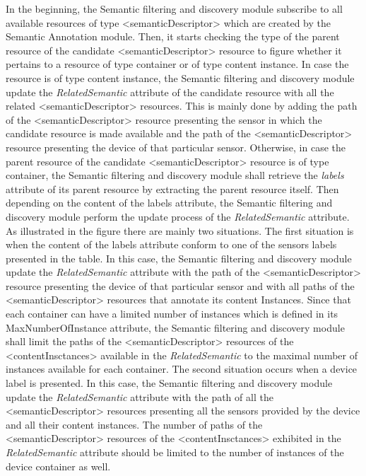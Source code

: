 In the beginning, the Semantic filtering and discovery module subscribe to all available resources of type <semanticDescriptor> which are created by the Semantic Annotation module. Then, it starts checking the type of the parent resource of the candidate <semanticDescriptor> resource to figure whether it pertains to a resource of type container or of type content instance. In case the resource is of type content instance, the Semantic filtering and discovery module update the \textit{RelatedSemantic} attribute of the candidate resource with all the related <semanticDescriptor> resources. This is mainly done by adding the path of the <semanticDescriptor> resource presenting the sensor in which the candidate resource is made available and the path of the <semanticDescriptor> resource presenting the device of that particular sensor. Otherwise, in case the parent resource of the candidate <semanticDescriptor> resource is of type container, the Semantic filtering and discovery module shall retrieve the \textit{labels} attribute of its parent resource by extracting the parent resource itself. Then depending on the content of the labels attribute, the Semantic filtering and discovery module perform the update process of the \textit{RelatedSemantic} attribute. As illustrated in the figure there are mainly two situations. The first situation is when the content of the labels attribute conform to one of the sensors labels presented in the table. In this case, the Semantic filtering and discovery module update the \textit{RelatedSemantic} attribute with the path of the <semanticDescriptor> resource presenting the device of that particular sensor and with all paths of the <semanticDescriptor> resources that annotate its content Instances. Since that each container can have a limited number of instances which is defined in its MaxNumberOfInstance attribute, the Semantic filtering and discovery module shall limit the paths of the <semanticDescriptor> resources of the <contentInsctances> available in the \textit{RelatedSemantic} to the maximal number of instances available for each container. The second situation occurs when a device label is presented. In this case, the Semantic filtering and discovery module update the \textit{RelatedSemantic} attribute with the path of all the <semanticDescriptor> resources presenting all the sensors provided by the device and all their content instances. The number of paths of the <semanticDescriptor> resources of the <contentInsctances> exhibited in the \textit{RelatedSemantic} attribute should be limited to the number of instances of the device container as well.



